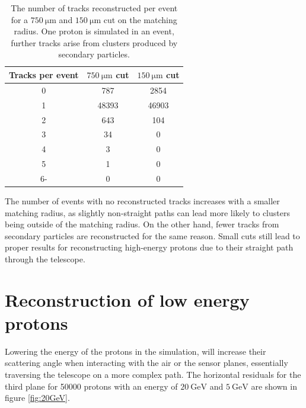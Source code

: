 \begin{table}
  \centering
  \begin{tabular}{c | c c}
    \toprule
    Tracks per event &  $\SI{750}{\micro\meter}$ cut & $\SI{150}{\micro\meter}$ cut\\
    \midrule
    0 & 787    & 2854  \\
    1 & 48393  & 46903  \\
    2 & 643    & 104  \\
    3 & 34     & 0  \\
    4 & 3      & 0   \\
    5 & 1      & 0    \\
    6- & 0 & 0 \\
  \end{tabular}
  \caption{The number of tracks reconstructed per event for a
  $\SI{750}{\micro\meter}$ and $\SI{150}{\micro\meter}$ cut on the
  matching radius. One proton is simulated in an event, further tracks arise from clusters
  produced by secondary particles.}
  \label{tab:cluster_per_track}
\end{table}

The number of events with no reconstructed tracks increases with a smaller matching radius, as slightly non-straight paths can lead
more likely to clusters being outside of the matching radius. On the other hand, fewer tracks from secondary particles are reconstructed
for the same reason. Small cuts still lead to proper results
for reconstructing high-energy protons due to their straight path through the telescope.



\section{Reconstruction of low energy protons}\label{sec:energy}
Lowering the energy of the protons in the simulation, will increase their scattering angle when interacting with the air or the sensor
planes, essentially traversing the telescope on a more complex path.
The horizontal residuals for the third plane for 50000 protons with an energy of $\SI{20}{\giga\eV}$ and $\SI{5}{\GeV}$ are shown in figure \ref{fig:20GeV}.

